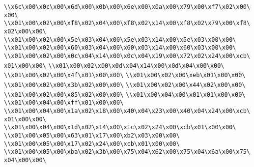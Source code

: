 \verb|\\x6c\x00\x0c\x00\x6d\x00\x0b\x00\x6e\x00\x0a\x00\x79\x00\xf7\x02\x00\x00\|\newline
\verb|\\x01\x00\x02\x00\xf8\x02\x04\x00\xf8\x02\x14\x00\xf8\x02\x79\x00\xf8\x02\x00\x00\|\newline
\verb|\\x01\x00\x02\x00\x5e\x03\x04\x00\x5e\x03\x14\x00\x5e\x03\x00\x00\|\newline
\verb|\\x01\x00\x02\x00\x60\x03\x04\x00\x60\x03\x14\x00\x60\x03\x00\x00\|\newline
\verb|\\x01\x00\x02\x00\x0c\x04\x14\x00\x0c\x04\x19\x00\x72\x02\x24\x00\xcb\x01\x00\x00\|\newline
\verb|\\x01\x00\x02\x00\x0d\x04\x14\x00\x0d\x04\x00\x00\|\newline
\verb|\\x01\x00\x02\x00\x4f\x01\x00\x00\|\newline
\verb|\\x01\x00\x02\x00\xeb\x01\x00\x00\|\newline
\verb|\\x01\x00\x02\x00\x3b\x02\x00\x00\|\newline
\verb|\\x01\x00\x02\x00\x44\x02\x00\x00\|\newline
\verb|\\x01\x00\x02\x00\x85\x02\x00\x00\|\newline
\verb|\\x01\x00\x04\x00\x01\x01\x00\x00\|\newline
\verb|\\x01\x00\x04\x00\xff\x01\x00\x00\|\newline
\verb|\\x01\x00\x04\x00\x1a\x02\x18\x00\x40\x04\x23\x00\x40\x04\x24\x00\xcb\x01\x00\x00\|\newline
\verb|\\x01\x00\x04\x00\x1d\x02\x14\x00\x1c\x02\x24\x00\xcb\x01\x00\x00\|\newline
\verb|\\x01\x00\x05\x00\x63\x01\x17\x00\xb2\x03\x00\x00\|\newline
\verb|\\x01\x00\x05\x00\x17\x02\x24\x00\xcb\x01\x00\x00\|\newline
\verb|\\x01\x00\x05\x00\xba\x02\x3b\x00\x75\x04\x62\x00\x75\x04\x6a\x00\x75\x04\x00\x00\|\newline
